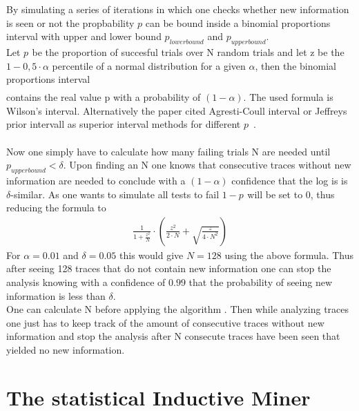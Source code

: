 \documentclass[
	a4paper,
	pagesize,
	pdftex,
	12pt,
	twoside, %
	BCOR=5mm, %
	ngerman,
	fleqn,
	final,
	]{scrartcl}
\begin{document}
By simulating a series of iterations in which one checks whether new information is seen or not the propbability $p$ can be bound inside a binomial proportions interval with upper and lower bound $p^{}_{lower bound}$ and $p^{}_{upper bound}$.\\
Let $p^{}$ be the proportion of succesful trials over N random trials and let z be the $1-0,5\cdot \alpha$ percentile of a normal distribution for a given $\alpha$, then the binomial proportions interval
\begin{align*}
[\frac{1}{1+\frac{z^2}{N}}\cdot(p^{}+\frac{z^2}{2N}-\sqrt{\frac{p^{}\cdot(1-p^{})}{N}+\frac{z}{4N^2}}),\frac{1}{1+\frac{z^2}{N}}\cdot(p^{}+\frac{z^2}{2N}+\sqrt{\frac{p^{}\cdot(1-p^{})}{N}+\frac{z}{4N^2}})]
\end{align*}
contains the real value p with a probability of $(1-\alpha)$. The used formula is Wilson's interval. Alternatively the paper cited Agresti-Coull interval or Jeffreys prior intervall as superior interval methods for different $p$~\cite{Intervals}.\\\\
Now one simply have to calculate how many failing trials N are needed until $p^{}_{upper bound}<\delta$. Upon finding an N one knows that consecutive traces without new information are needed to conclude with a $(1-\alpha)$ confidence that the log is is $\delta$-similar. As one wants to simulate all tests to fail $1-p^{}$ will be set to $0$, thus reducing the formula to
\begin{align*}
\frac{1}{1+\frac{z^2}{N}}\cdot(\frac{z^2}{2\cdot N}+\sqrt{\frac{z}{4\cdot N^2}})
\end{align*}
For $\alpha=0.01$ and $\delta=0.05$ this would give $N=128$ using the above formula. Thus after seeing 128 traces that do not contain new information one can stop the analysis knowing with a confidence of $0.99$ that the probability of seeing new information is less than $\delta$.\\
One can calculate N before applying the algorithm . Then while analyzing traces one just has to keep track of the amount of consecutive traces without new information and stop the analysis after N consecute traces have been seen that yielded no new information.\\
\section{The statistical Inductive Miner}
\end{document}
